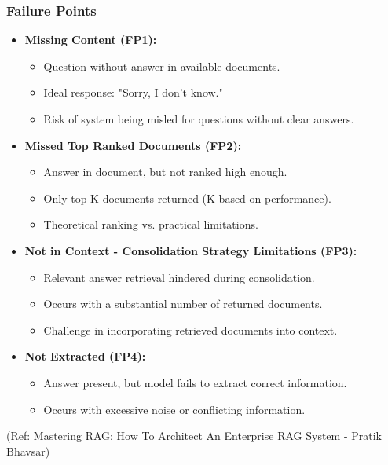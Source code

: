 \begin{frame}[fragile]\frametitle{Failure Points}
\begin{itemize}
  \item \textbf{Missing Content (FP1):}
    \begin{itemize}
        \item Question without answer in available documents.
        \item Ideal response: "Sorry, I don’t know."
        \item Risk of system being misled for questions without clear answers.
    \end{itemize}
  
  \item \textbf{Missed Top Ranked Documents (FP2):}
    \begin{itemize}
        \item Answer in document, but not ranked high enough.
        \item Only top K documents returned (K based on performance).
        \item Theoretical ranking vs. practical limitations.
    \end{itemize}
  
  \item \textbf{Not in Context - Consolidation Strategy Limitations (FP3):}
    \begin{itemize}
        \item Relevant answer retrieval hindered during consolidation.
        \item Occurs with a substantial number of returned documents.
        \item Challenge in incorporating retrieved documents into context.
    \end{itemize}
  
  \item \textbf{Not Extracted (FP4):}
    \begin{itemize}
        \item Answer present, but model fails to extract correct information.
        \item Occurs with excessive noise or conflicting information.
    \end{itemize}
  

\end{itemize}

{\tiny (Ref: Mastering RAG: How To Architect An Enterprise RAG System - Pratik Bhavsar)}

\end{frame}

